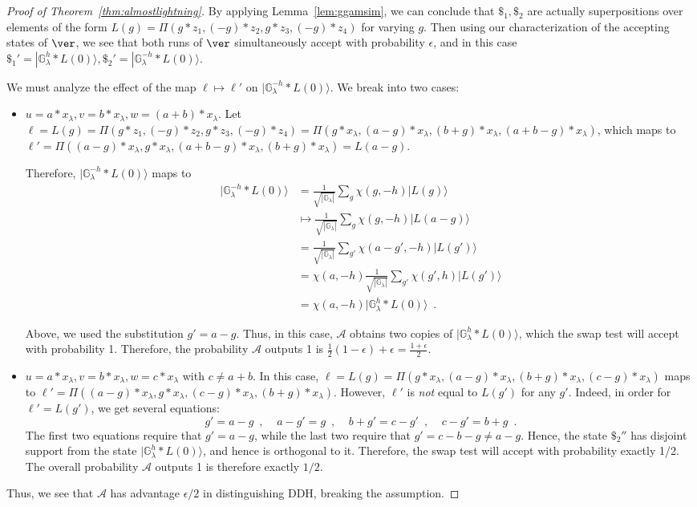 \documentclass{article}\usepackage[a4paper,margin=20mm]{geometry}
\numberwithin{theorem}{section}
\numberwithin{equation}{section}
\newcommand{\G}{\mathbb{G}}
\newcommand{\As}{{\mathcal{A}}}
\begin{document}
\begin{proof}[Proof of Theorem~\ref{thm:almostlightning}]
	By applying Lemma~\ref{lem:ggamsim}, we can conclude that $\$_1,\$_2$ are actually superpositions over elements of the form $L(g)=\Pi(g*z_1,(-g)*z_2,g*z_3,(-g)*z_4)$ for varying $g$. Then using our characterization of the accepting states of $\ver$, we see that both runs of $\ver$ simultaneously accept with probability $\epsilon$, and in this case $\$_1'=|\G_\lambda^h*L(0)\rangle,\$_2'=|\G_\lambda^{-h}*L(0)\rangle$.
	
	We must analyze the effect of the map $\ell\mapsto\ell'$ on $|\G_\lambda^{-h}*L(0)\rangle$. We break into two cases:
	\begin{itemize}
		\item $u=a*x_\lambda,v=b*x_\lambda,w=(a+b)*x_\lambda$. Let $\ell=L(g)=\Pi(g*z_1,(-g)*z_2,g*z_3,(-g)*z_4)=\Pi(g*x_\lambda,(a-g)*x_\lambda,(b+g)*x_\lambda,(a+b-g)*x_\lambda)$, which maps to $\ell'=\Pi((a-g)*x_\lambda,g*x_\lambda,(a+b-g)*x_\lambda,(b+g)*x_\lambda)=L(a-g)$.
		
		Therefore, $|\G_\lambda^{-h}*L(0)\rangle$ maps to
		\begin{align*}|\G_\lambda^{-h}*L(0)\rangle&=\frac{1}{\sqrt{|\G_\lambda|}}\sum_g \chi(g,-h)|L(g)\rangle\\&\mapsto\frac{1}{\sqrt{|\G_\lambda|}}\sum_g \chi(g,-h)|L(a-g)\rangle\\&=\frac{1}{\sqrt{|\G_\lambda|}}\sum_{g'} \chi(a-g',-h)|L(g')\rangle\\&=\chi(a,-h)\frac{1}{\sqrt{|\G_\lambda|}}\sum_{g'} \chi(g',h)|L(g')\rangle\\&=\chi(a,-h)|\G_\lambda^{h}*L(0)\rangle\enspace .\end{align*}
		
		Above, we used the substitution $g'=a-g$. Thus, in this case, $\As$ obtains two copies of $|\G_\lambda^{h}*L(0)\rangle$, which the swap test will accept with probability 1. Therefore, the probability $\As$ outputs 1 is $\frac{1}{2}(1-\epsilon)+\epsilon=\frac{1+\epsilon}{2}$.
		\item $u=a*x_\lambda,v=b*x_\lambda,w=c*x_\lambda$ with $c\neq a+b$. In this case, $\ell=L(g)=\Pi(g*x_\lambda,(a-g)*x_\lambda,(b+g)*x_\lambda,(c-g)*x_\lambda)$ maps to $\ell'=\Pi((a-g)*x_\lambda,g*x_\lambda,(c-g)*x_\lambda,(b+g)*x_\lambda)$. However, $\ell'$ is \emph{not} equal to $L(g')$ for any $g'$. Indeed, in order for $\ell'=L(g')$, we get several equations:
		\[g'=a-g\enspace ,\;\;\;\;a-g'=g\enspace ,\;\;\;\;b+g'=c-g'\enspace ,\;\;\;\;c-g'=b+g\enspace .\]
		The first two equations require that $g'=a-g$, while the last two require that $g'=c-b-g\neq a-g$. Hence, the state $\$_2''$ has disjoint support from the state $|\G_\lambda^{h}*L(0)\rangle$, and hence is orthogonal to it. Therefore, the swap test will accept with probability exactly 1/2. The overall probability $\As$ outputs 1 is therefore exactly $1/2$.
	\end{itemize}
	Thus, we see that $\As$ has advantage $\epsilon/2$ in distinguishing DDH, breaking the assumption.\end{proof}
\end{document}
